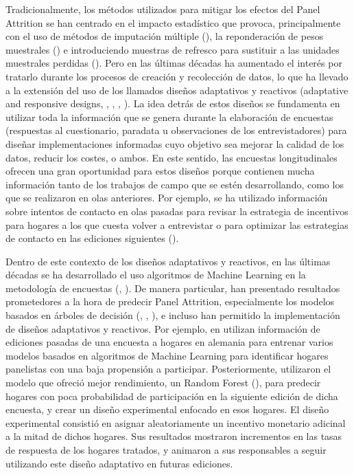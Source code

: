 Tradicionalmente, los métodos utilizados para mitigar los efectos del Panel Attrition se han centrado en el impacto estadístico que provoca, principalmente con el uso de métodos de imputación múltiple (\cite{rubin1987multiple}), la reponderación de pesos muestrales (\cite{groves2009survey}) e introduciendo muestras de refresco para sustituir a las unidades muestrales perdidas (\cite{hirano1998combining}). Pero en las últimas décadas ha aumentado el interés por tratarlo durante los procesos de creación y recolección de datos, lo que ha llevado a la extensión del uso de los llamados diseños adaptativos y reactivos (adaptative and responsive designs, \cite{groves2006responsive}, \cite{wagner2008adaptive}, \cite{schouten2017adaptive}, \cite{tourangeau2017adaptive}). La idea detrás de estos diseños se fundamenta en utilizar toda la información que se genera durante la elaboración de encuestas (respuestas al cuestionario, paradata u observaciones de los entrevistadores) para diseñar implementaciones informadas cuyo objetivo sea mejorar la calidad de los datos, reducir los costes, o ambos. En este sentido, las encuestas longitudinales ofrecen una gran oportunidad para estos diseños porque contienen mucha información tanto de los trabajos de campo que se estén desarrollando, como los que se realizaron en olas anteriores. Por ejemplo, se ha utilizado información sobre intentos de contacto en olas pasadas para revisar la estrategia de incentivos para hogares a los que cuesta volver a entrevistar \cite{mcgonagle2022effects} o para optimizar las estrategias de contacto en las ediciones siguientes (\cite{kreuter2015note}).

Dentro de este contexto de los diseños adaptativos y reactivos, en las últimas décadas se ha desarrollado el uso algoritmos de Machine Learning en la metodología de encuestas (\cite{buskirk2018introduction}, \cite{kern2019tree}). De manera particular, han presentado resultados prometedores a la hora de predecir Panel Attrition, especialmente los modelos basados en árboles de decisión (\cite{kern2019tree}, \cite{kern2021predicting}, \cite{liu2020using}), e incluso han permitido la implementación de diseños adaptativos y reactivos. Por ejemplo, en \cite{beste2023case} utilizan información de ediciones pasadas de una encuesta a hogares en alemania para entrenar varios modelos basados en algoritmos de Machine Learning para identificar hogares panelistas con una baja propensión a participar. Posteriormente, utilizaron el modelo que ofreció mejor rendimiento, un Random Forest (\cite{breiman2001random}), para predecir hogares con poca probabilidad de participación en la siguiente edición de dicha encuesta, y crear un diseño experimental enfocado en esos hogares. El diseño experimental consistió en asignar aleatoriamente un incentivo monetario adicinal a la mitad de dichos hogares. Sus resultados mostraron incrementos en las tasas de respuesta de los hogares tratados, y animaron a sus responsables a seguir utilizando este diseño adaptativo en futuras ediciones.


